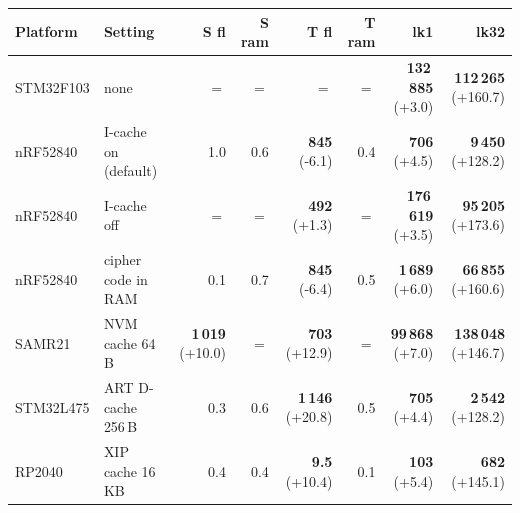 \begin{tabular}{llrrrrrr}
\hline
Platform & Setting & S fl & S ram & T fl & T ram & lk1 & lk32\\
\hline
STM32F103 & none & $=$ & $=$ & $=$ & $=$ & \textbf{132\,885} {\scriptsize(+3.0)} & \textbf{112\,265} {\scriptsize(+160.7)}\\
nRF52840 & I-cache on (default) & 1.0 & 0.6 & \textbf{845} {\scriptsize(-6.1)} & 0.4 & \textbf{706} {\scriptsize(+4.5)} & \textbf{9\,450} {\scriptsize(+128.2)}\\
nRF52840 & I-cache off & $=$ & $=$ & \textbf{492} {\scriptsize(+1.3)} & $=$ & \textbf{176\,619} {\scriptsize(+3.5)} & \textbf{95\,205} {\scriptsize(+173.6)}\\
nRF52840 & cipher code in RAM & 0.1 & 0.7 & \textbf{845} {\scriptsize(-6.4)} & 0.5 & \textbf{1\,689} {\scriptsize(+6.0)} & \textbf{66\,855} {\scriptsize(+160.6)}\\
SAMR21 & NVM cache 64\,B & \textbf{1\,019} {\scriptsize(+10.0)} & $=$ & \textbf{703} {\scriptsize(+12.9)} & $=$ & \textbf{99\,868} {\scriptsize(+7.0)} & \textbf{138\,048} {\scriptsize(+146.7)}\\
STM32L475 & ART D-cache 256\,B & 0.3 & 0.6 & \textbf{1\,146} {\scriptsize(+20.8)} & 0.5 & \textbf{705} {\scriptsize(+4.4)} & \textbf{2\,542} {\scriptsize(+128.2)}\\
RP2040 & XIP cache 16\,KB & 0.4 & 0.4 & \textbf{9.5} {\scriptsize(+10.4)} & 0.1 & \textbf{103} {\scriptsize(+5.4)} & \textbf{682} {\scriptsize(+145.1)}\\
\hline
\end{tabular}
